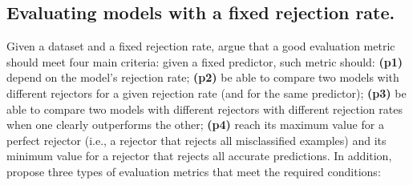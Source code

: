 \subsection{Evaluating models with a fixed rejection rate.}
Given a dataset and a fixed rejection rate, \citet{Condessa2017} argue that a good evaluation metric should meet four main criteria: given a fixed predictor, such metric should: \textbf{(p1)} depend on the model's rejection rate; \textbf{(p2)} be able to compare two models with different rejectors for a given rejection rate (and for the same predictor); \textbf{(p3)} be able to compare two models with different rejectors with different rejection rates when one clearly outperforms the other; \textbf{(p4)} reach its maximum value for a perfect rejector (i.e., a rejector that rejects all misclassified examples) and its minimum value for a rejector that rejects all accurate predictions. In addition, \citet{Condessa2017} propose three types of evaluation metrics that meet the required conditions:


